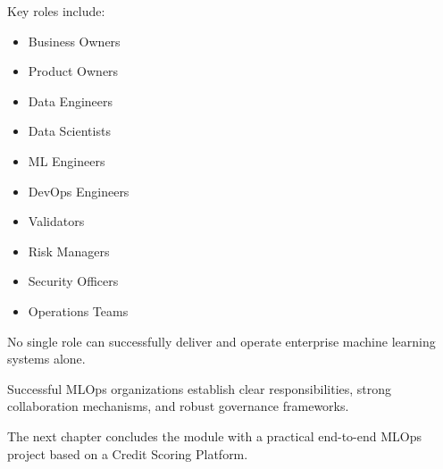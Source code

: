 Key roles include:

\begin{itemize}
    \item Business Owners
    \item Product Owners
    \item Data Engineers
    \item Data Scientists
    \item ML Engineers
    \item DevOps Engineers
    \item Validators
    \item Risk Managers
    \item Security Officers
    \item Operations Teams
\end{itemize}

No single role can successfully deliver and operate enterprise machine learning systems alone.

Successful MLOps organizations establish clear responsibilities, strong collaboration mechanisms, and robust governance frameworks.

The next chapter concludes the module with a practical end-to-end MLOps project based on a Credit Scoring Platform.